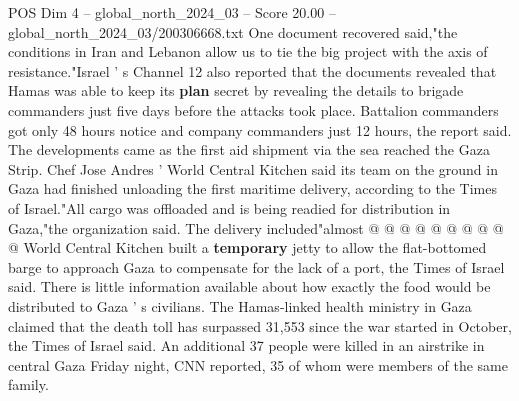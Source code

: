 \begin{textsample}{POS Dim 4 – global\_north\_2024\_03 – Score 20.00 – global\_north\_2024\_03/200306668.txt}
One document recovered said,"the conditions in Iran and Lebanon allow us to tie the big project with the axis of resistance."Israel ' s Channel 12 also reported that the documents revealed that Hamas was able to keep its \textbf{plan} secret by revealing the details to brigade commanders just five days before the attacks took place.
Battalion commanders got only 48 hours notice and company commanders just 12 hours, the report said.
The developments came as the first aid shipment via the sea reached the Gaza Strip.
Chef Jose Andres ' World Central Kitchen said its team on the ground in Gaza had finished unloading the first maritime delivery, according to the Times of Israel."All cargo was offloaded and is being readied for distribution in Gaza,"the organization said.
The delivery included"almost @ @ @ @ @ @ @ @ @ @ World Central Kitchen built a \textbf{temporary} jetty to allow the flat-bottomed barge to approach Gaza to compensate for the lack of a port, the Times of Israel said.
There is little information available about how exactly the food would be distributed to Gaza ' s civilians.
The Hamas-linked health ministry in Gaza claimed that the death toll has surpassed 31,553 since the war started in October, the Times of Israel said.
An additional 37 people were killed in an airstrike in central Gaza Friday night, CNN reported, 35 of whom were members of the same family.

\end{textsample}
